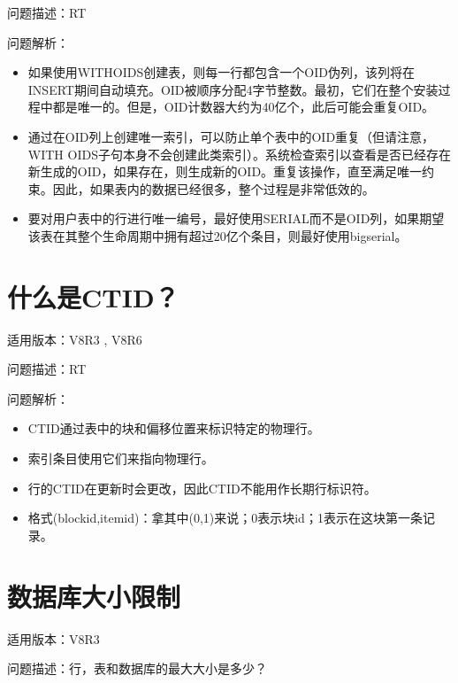 \documentclass[a4,10pt,oneside,english]{sphinxmanual}
\begin{document}
问题描述：RT

问题解析：
\begin{itemize}
\item {} 
如果使用WITHOIDS创建表，则每一行都包含一个OID伪列，该列将在INSERT期间自动填充。OID被顺序分配4字节整数。最初，它们在整个安装过程中都是唯一的。但是，OID计数器大约为40亿个，此后可能会重复OID。

\item {} 
通过在OID列上创建唯一索引，可以防止单个表中的OID重复（但请注意，WITH OIDS子句本身不会创建此类索引）。系统检查索引以查看是否已经存在新生成的OID，如果存在，则生成新的OID。重复该操作，直至满足唯一约束。因此，如果表内的数据已经很多，整个过程是非常低效的。

\item {} 
要对用户表中的行进行唯一编号，最好使用SERIAL而不是OID列，如果期望该表在其整个生命周期中拥有超过20亿个条目，则最好使用bigserial。

\end{itemize}


\section{什么是CTID？}
\label{\detokenize{sql:ctid}}
适用版本：V8R3 , V8R6

问题描述：RT

问题解析：
\begin{itemize}
\item {} 
CTID通过表中的块和偏移位置来标识特定的物理行。

\item {} 
索引条目使用它们来指向物理行。

\item {} 
行的CTID在更新时会更改，因此CTID不能用作长期行标识符。

\item {} 
格式(blockid,itemid)：拿其中(0,1)来说；0表示块id；1表示在这块第一条记录。

\end{itemize}


\section{数据库大小限制}
\label{\detokenize{sql:id15}}
适用版本：V8R3

问题描述：行，表和数据库的最大大小是多少？
\end{document}
